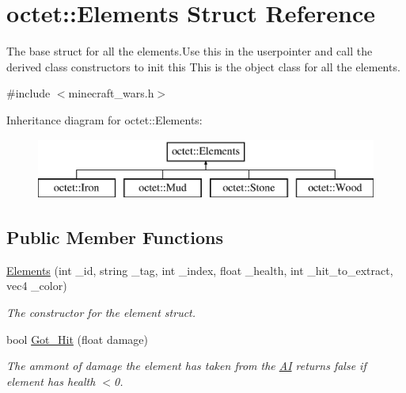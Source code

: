 \hypertarget{structoctet_1_1_elements}{\section{octet\+:\+:Elements Struct Reference}
\label{structoctet_1_1_elements}
}


The base struct for all the elements.\+Use this in the userpointer and call the derived class constructors to init this This is the object class for all the elements.  




{\ttfamily \#include $<$minecraft\+\_\+wars.\+h$>$}

Inheritance diagram for octet\+:\+:Elements\+:\begin{figure}[H]
\begin{center}
\leavevmode
\includegraphics[height=2.000000cm]{structoctet_1_1_elements}
\end{center}
\end{figure}
\subsection*{Public Member Functions}
\begin{DoxyCompactItemize}
\item 
\hyperlink{structoctet_1_1_elements_a72500eca591953a90acb6d66b9b426d5}{Elements} (int \+\_\+id, string \+\_\+tag, int \+\_\+index, float \+\_\+health, int \+\_\+hit\+\_\+to\+\_\+extract, vec4 \+\_\+color)
\begin{DoxyCompactList}\small\item\em The constructor for the element struct. \end{DoxyCompactList}\item 
bool \hyperlink{structoctet_1_1_elements_a7175c9c96fb78c7ad933ca88f8b88f84}{Got\+\_\+\+Hit} (float damage)
\begin{DoxyCompactList}\small\item\em The ammont of damage the element has taken from the \hyperlink{structoctet_1_1_a_i}{A\+I} returns false if element has health $<$0. \end{DoxyCompactList}\end{DoxyCompactItemize}
